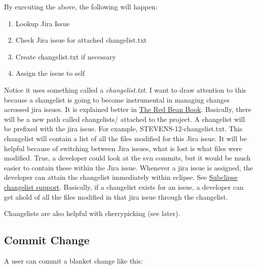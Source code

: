 \documentclass[12pt,notitlepage]{article}
\begin{document}
By executing the above, the following will happen:
\begin{enumerate}
  \item Lookup Jira Issue
  \item Check Jira issue for attached changelist.txt
  \item Create changelist.txt if necessary
  \item Assign the issue to self
\end{enumerate}

Notice it uses something called a \emph{changelist.txt}. I want to
draw attention to this because a changelist is going to become
instrumental in managing changes acrossed jira issues. It is explained
better in
\href{http://svnbook.red-bean.com/en/1.7/svn.advanced.changelists.html}{The
  Red Bean Book}. Basically, there will be a new path called
changelists/ attached to the project. A changelist will be prefixed
with the jira issue. For example, STEVENS-12-changelist.txt. This
changelist will contain a list of all the files modified for this Jira
issue. It will be helpful because of switching between Jira issues,
what is lost is what files were modified. True, a developer could look
at the svn commits, but it would be much easier to contain these
within the Jira issue. Whenever a jira issue is assigned, the
developer can attain the changelist immediately within eclipse. See
\href{http://subclipse.tigris.org/issues/show_bug.cgi?id=635}{Subclipse
changelist support}. Basically, if a changelist exists for an issue, a
developer can get ahold of all the files modified in that jira issue
through the changelist.

Changelists are also helpful with cherrypicking (see later).

\newpage

\subsection{Commit Change}

A user can commit a blanket change like this:
\end{document}
